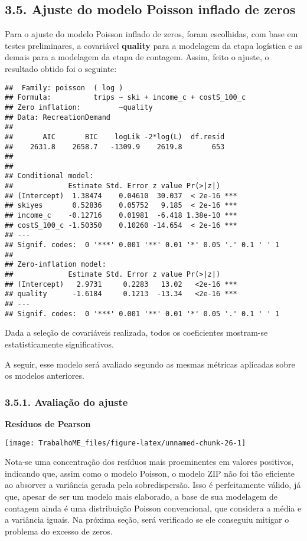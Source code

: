 \documentclass[
]{article}
\begin{document}
\subsection{3.5. Ajuste do modelo Poisson inflado de
zeros}\label{ajuste-do-modelo-poisson-inflado-de-zeros}

Para o ajuste do modelo Poisson inflado de zeros, foram escolhidas, com
base em testes preliminares, a covariável \textbf{quality} para a
modelagem da etapa logística e as demais para a modelagem da etapa de
contagem. Assim, feito o ajuste, o resultado obtido foi o seguinte:

\begin{verbatim}
##  Family: poisson  ( log )
## Formula:          trips ~ ski + income_c + costS_100_c
## Zero inflation:         ~quality
## Data: RecreationDemand
## 
##       AIC       BIC    logLik -2*log(L)  df.resid 
##    2631.8    2658.7   -1309.9    2619.8       653 
## 
## 
## Conditional model:
##             Estimate Std. Error z value Pr(>|z|)    
## (Intercept)  1.38474    0.04610  30.037  < 2e-16 ***
## skiyes       0.52836    0.05752   9.185  < 2e-16 ***
## income_c    -0.12716    0.01981  -6.418 1.38e-10 ***
## costS_100_c -1.50350    0.10260 -14.654  < 2e-16 ***
## ---
## Signif. codes:  0 '***' 0.001 '**' 0.01 '*' 0.05 '.' 0.1 ' ' 1
## 
## Zero-inflation model:
##             Estimate Std. Error z value Pr(>|z|)    
## (Intercept)   2.9731     0.2283   13.02   <2e-16 ***
## quality      -1.6184     0.1213  -13.34   <2e-16 ***
## ---
## Signif. codes:  0 '***' 0.001 '**' 0.01 '*' 0.05 '.' 0.1 ' ' 1
\end{verbatim}

Dada a seleção de covariáveis realizada, todos os coeficientes
mostram-se estatisticamente significativos.

A seguir, esse modelo será avaliado segundo as mesmas métricas aplicadas
sobre os modelos anteriores.

\subsubsection{3.5.1. Avaliação do
ajuste}\label{avaliauxe7uxe3o-do-ajuste}

\textbf{Resíduos de Pearson}

\begin{center}\texttt{[image: TrabalhoME\_files/figure-latex/unnamed-chunk-26-1]} \end{center}

Nota-se uma concentração dos resíduos mais proeminentes em valores
positivos, indicando que, assim como o modelo Poisson, o modelo ZIP não
foi tão eficiente ao absorver a variância gerada pela sobredispersão.
Isso é perfeitamente válido, já que, apesar de ser um modelo mais
elaborado, a base de sua modelagem de contagem ainda é uma distribuição
Poisson convencional, que considera a média e a variância iguais. Na
próxima seção, será verificado se ele conseguiu mitigar o problema do
excesso de zeros.
\end{document}
